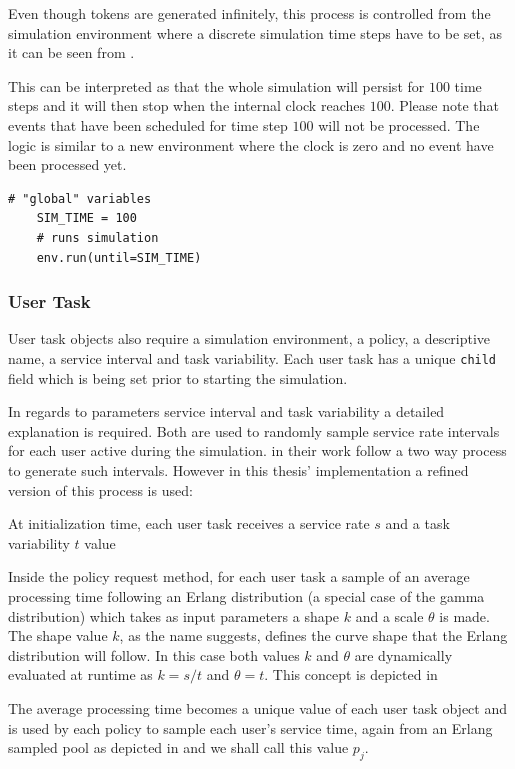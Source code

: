 \documentclass[draft=false]{seal_thesis}
\begin{document}
Even though tokens are generated infinitely, this process is controlled from the simulation environment where a discrete simulation time steps have to be set, as it can be seen from .

This can be interpreted as that the whole simulation will persist for $100$ time steps and it will then stop when the internal clock reaches $100$. Please note that events that have been scheduled for time step $100$ will not be processed. The logic is similar to a new environment where the clock is zero and no event have been processed yet.

\begin{lstlisting}[caption=Starting the simulation with discrete time steps,label=lst:simulation_steps,style=CustomPython]
    # "global" variables
    SIM_TIME = 100
    # runs simulation
    env.run(until=SIM_TIME)
\end{lstlisting}

\subsubsection{User Task}
\label{subsec:user_task}

User task objects also require a simulation environment, a policy, a descriptive name, a service interval and task variability. Each user task has a unique \texttt{child} field which is being set prior to starting the simulation.

In regards to parameters service interval and task variability a detailed explanation is required. Both are used to randomly sample service rate intervals for each user active during the simulation. \citet[p. 8]{Zeng2005} in their work follow a two way process to generate such intervals. However in this thesis' implementation a refined version of this process is used:
\begin{enumerate*}
	\item At initialization time, each user task receives a service rate $s$ and a task variability $t$ value
	\item Inside the policy request method, for each user task a sample of an average processing time following an Erlang distribution (a special case of the gamma distribution) which takes as input parameters a shape $k$ and a scale $\theta$ is made. The shape value $k$, as the name suggests, defines the curve shape that the Erlang distribution will follow. In this case both values $k$ and $\theta$ are dynamically evaluated at runtime as $k=s/t$ and $\theta = t$. This concept is depicted in 
	\item The average processing time becomes a unique value of each user task object and is used by each policy to sample each user's service time, again from an Erlang sampled pool as depicted in  and we shall call this value $p_j$.
\end{enumerate*}
\end{document}
